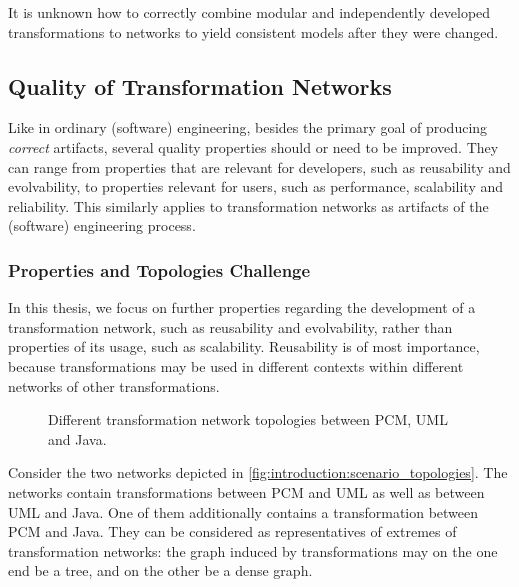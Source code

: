 \begin{problemstatement}
    It is unknown how to correctly combine modular and independently developed transformations to networks to yield consistent models after they were changed.
\end{problemstatement}

\subsection{Quality of Transformation Networks}

Like in ordinary (software) engineering, besides the primary goal of producing \emph{correct} artifacts, several quality properties should or need to be improved.
They can range from properties that are relevant for developers, such as reusability and evolvability, to properties relevant for users, such as performance, scalability and reliability.
This similarly applies to transformation networks as artifacts of the (software) engineering process.

\subsubsection*{Properties and Topologies Challenge}
\label{chap:introduction:challenges:quality:properties}

In this thesis, we focus on further properties regarding the development of a transformation network, such as reusability and evolvability, rather than properties of its usage, such as scalability.
Reusability is of most importance, because transformations may be used in different contexts within different networks of other transformations.

\begin{figure}
    \centering
    
    \caption[Example for network topologies]{Different transformation network topologies between \gls{PCM}, \gls{UML} and Java.}
    \label{fig:introduction:scenario_topologies}
\end{figure}

Consider the two networks depicted in \autoref{fig:introduction:scenario_topologies}.
The networks contain transformations between \gls{PCM} and \gls{UML} as well as between \gls{UML} and Java. 
One of them additionally contains a transformation between \gls{PCM} and Java.
They can be considered as representatives of extremes of transformation networks:
the graph induced by transformations may on the one end be a tree, and on the other be a dense graph.

